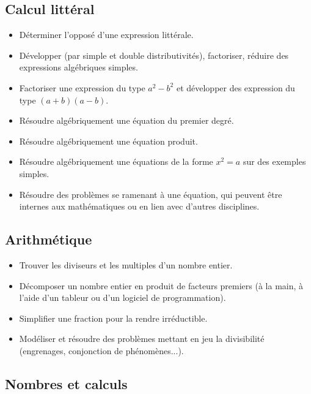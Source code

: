 \documentclass[a4paper,12pt,fleqn]{article}	
\begin{document}
\renewcommand{\labelitemi}{}

\subsection*{Calcul littéral}

\begin{itemize}
	\item {}Déterminer l’opposé d’une expression littérale.
	\item {}Développer (par simple et double distributivités), factoriser, réduire des expressions algébriques simples.
	\item {}Factoriser une expression du type $a^2-b^2$ et développer des expression du type $(a+b)(a-b)$.
	\item {}Résoudre algébriquement une équation du premier degré.
	\item {}Résoudre algébriquement une équation produit.
	\item {}Résoudre algébriquement une équations de la forme $x^2=a$ sur des exemples simples.
	\item {}Résoudre des problèmes se ramenant à une équation, qui peuvent être internes aux mathématiques ou en lien avec d’autres disciplines.

\end{itemize}

\subsection*{Arithmétique}

\begin{itemize}
	\item {}Trouver les diviseurs et les multiples d'un nombre entier.
	\item {}Décomposer un nombre entier en produit de facteurs premiers (à la main, à l’aide d’un tableur ou d’un logiciel de programmation).
	\item {}Simplifier une fraction pour la rendre irréductible.
	\item {}Modéliser et résoudre des problèmes mettant en jeu la divisibilité (engrenages, conjonction de phénomènes...).
\end{itemize}

\subsection*{Nombres et calculs}
\end{document}
